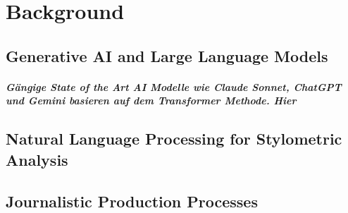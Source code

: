 \chapter{Background}
\label{ch:background}


\section{Generative AI and Large Language Models}
\paragraph{Gängige State of the Art AI Modelle wie Claude Sonnet\cite{geminiteam2025geminifamilyhighlycapable}, ChatGPT\cite{singh2026openaigpt5card} und Gemini\cite{TheC3} basieren auf dem Transformer\cite{vaswani2023attentionneed} Methode. Hier}

\section{Natural Language Processing for Stylometric Analysis}

\section{Journalistic Production Processes}